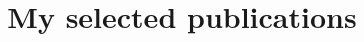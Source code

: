 \documentclass[conference]{article}
\begin{document}
\title{My selected publications
\cite{Cetic_Popovic_Djukic_Kovacevic_2015}
\cite{djukic2014embedded}
\cite{Krunic_Popovic_Krunic_Cetic_2016}
\cite{2024_stojanovic_cetic}
\cite{2024_stojanovic_pavkovic}
\cite{2023_stojanovic}
\cite{2020_stevic}
}

\maketitle




\end{document}
